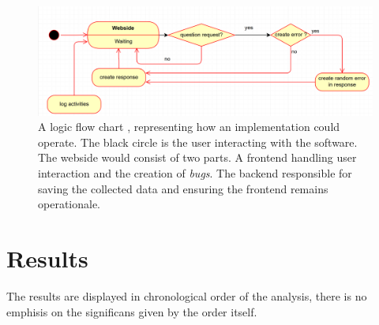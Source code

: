 \documentclass[runningheads]{llncs}
\begin{document}
\subsection{}

\begin{figure}
    \includegraphics[width=\textwidth]{UML Prototyp.PNG}
    \caption{A logic flow chart , representing how an implementation could operate.
    The black circle is the user interacting with the software. The webside would
    consist of two parts. A frontend handling user interaction and the creation of {\itshape bugs}.
    The backend responsible for saving the collected data and ensuring the frontend
    remains operationale.} \label{fig1}
\end{figure}


\clearpage
\section{Results}
The results are displayed in chronological order of the analysis, there is
no emphisis on the significans given by the order itself.
\end{document}
